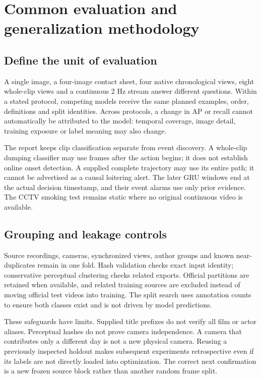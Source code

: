 \chapter{Common evaluation and generalization methodology}
\label{ch:method}
\section{Define the unit of evaluation}
A single image, a four-image contact sheet, four native chronological views, eight whole-clip views and a continuous 2 Hz stream answer different questions. Within a stated protocol, competing models receive the same planned examples, order, definitions and split identities. Across protocols, a change in AP or recall cannot automatically be attributed to the model: temporal coverage, image detail, training exposure or label meaning may also change.

The report keeps clip classification separate from event discovery. A whole-clip dumping classifier may use frames after the action begins; it does not establish online onset detection. A supplied complete trajectory may use its entire path; it cannot be advertised as a causal loitering alert. The later GRU windows end at the actual decision timestamp, and their event alarms use only prior evidence. The CCTV smoking test remains static where no original continuous video is available.

\section{Grouping and leakage controls}
Source recordings, cameras, synchronized views, author groups and known near-duplicates remain in one fold. Hash validation checks exact input identity; conservative perceptual clustering checks related exports. Official partitions are retained when available, and related training sources are excluded instead of moving official test videos into training. The split search uses annotation counts to ensure both classes exist and is not driven by model predictions.

These safeguards have limits. Supplied title prefixes do not verify all film or actor aliases. Perceptual hashes do not prove camera independence. A camera that contributes only a different day is not a new physical camera. Reusing a previously inspected holdout makes subsequent experiments retrospective even if its labels are not directly loaded into optimization. The correct next confirmation is a new frozen source block rather than another random frame split.

